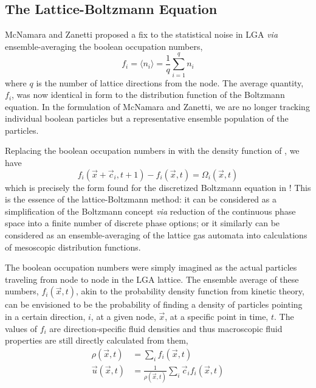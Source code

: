 \subsection{The Lattice-Boltzmann Equation}\label{sec:lbm-equations}

McNamara and Zanetti proposed a fix to the statistical noise in LGA \textit{via} ensemble-averaging the boolean occupation numbers,\cite{McNamara1988}
\begin{equation}\label{eq:lbm-pdf}
	f_i = \langle n_i \rangle = \frac{1}{q}\sum_{i=1}^qn_i
\end{equation}
where $q$ is the number of lattice directions from the node. The average quantity, $f_i$, was now identical in form to the distribution function of the Boltzmann equation. In the formulation of McNamara and Zanetti, we are no longer tracking individual boolean particles but a representative ensemble population of the particles.

Replacing the boolean occupation numbers in  with the density function of , we have
\begin{equation}\label{eq:lbm-evolution}
	f_i(\vec{x}+\vec{c}_i, t + 1) - f_i(\vec{x},t) = \Omega_i(\vec{x},t)
\end{equation}
which is precisely the form found for the discretized Boltzmann equation in ! This is the essence of the lattice-Boltzmann method: it can be considered as a simplification of the Boltzmann concept \textit{via} reduction of the continuous phase space into a finite number of discrete phase options; or it similarly can be considered as an ensemble-averaging of the lattice gas automata into calculations of mesoscopic distribution functions.

The boolean occupation numbers were simply imagined as the actual particles traveling from node to node in the LGA lattice. The ensemble average of these numbers, $f_i(\vec{x},t)$, akin to the probability density function from kinetic theory, can be envisioned to be the probability of finding a density of particles pointing in a certain direction, $i$, at a given node, $\vec{x}$, at a specific point in time, $t$. The values of $f_i$ are direction-specific fluid densities and thus macroscopic fluid properties are still directly calculated from them,
\begin{subequations}\label{eq:lbm2physical}
\begin{align}
	\rho(\vec{x},t) &= \sum_i f_i(\vec{x},t)\\
	\vec{u}(\vec{x},t) &= \frac{1}{\rho(\vec{x},t)}\sum_i \vec{c}_if_i(\vec{x},t)
\end{align}
\end{subequations}

